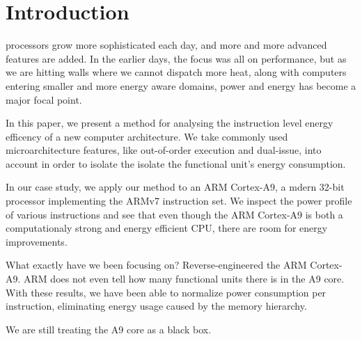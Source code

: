 \section{Introduction}

 processors grow more sophisticated each day, and
more and more advanced features are added. In the earlier days, the focus
was all on performance, but as we are hitting walls where we cannot dispatch
more heat, along with computers entering smaller and more energy aware domains,
power and energy has become a major focal point.

In this paper, we present a method for analysing the instruction level energy
efficency of a new computer architecture. We take commonly used
microarchitecture features, like out-of-order execution and dual-issue, into
account in order to isolate the isolate the functional unit's energy consumption.

In our case study, we apply our method to an ARM Cortex-A9, a mdern 32-bit
processor implementing the ARMv7 instruction set. We inspect the power
profile of various instructions and see that even though the ARM
Cortex-A9 is both a computationaly strong and energy efficient CPU, there are
room for energy improvements.


What exactly have we been focusing on? Reverse-engineered the ARM Cortex-A9. ARM
does not even tell how many functional units there is in the A9 core. With these
results, we have been able to normalize power consumption per instruction,
eliminating energy usage caused by the memory hierarchy.

We are still treating the A9 core as a black box.
